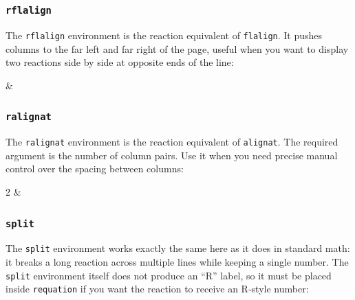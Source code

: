 		\begin{rmultline}
			 \\
			\ce{->} \\
			\label{rxn:fission}
		\end{rmultline}
		
		\subsubsection{\texttt{rflalign}}
		The \texttt{rflalign} environment is the reaction equivalent of \texttt{flalign}. It pushes columns to the far left and far right of the page, useful when you want to display two reactions side by side at opposite ends of the line:
		
		\begin{rflalign}
			 &  \quad %
			\label{rxn:flalign}
		\end{rflalign}
		
		\subsubsection{\texttt{ralignat}}
		The \texttt{ralignat} environment is the reaction equivalent of \texttt{alignat}. The required argument is the number of column pairs. Use it when you need precise manual control over the spacing between columns:
		
		\begin{ralignat}{2}
			 &\qquad {}
			\label{rxn:alignat}
		\end{ralignat}
		
		\subsubsection{\texttt{split}}
		The \texttt{split} environment works exactly the same here as it does in standard math: it breaks a long reaction across multiple lines while keeping a single number. The \texttt{split} environment itself does not produce an “R” label, so it must be placed inside \texttt{requation} if you want the reaction to receive an R‑style number:
		
		\begin{requation}
			\begin{split}
			\end{split}
		\end{requation}


